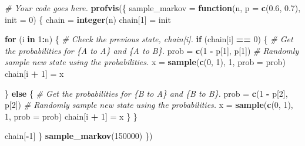 \documentclass[
]{article}
\newenvironment{Shaded}{\begin{snugshade}}{\end{snugshade}}
\newcommand{\CommentTok}[1]{\textcolor[rgb]{0.56,0.35,0.01}{\textit{#1}}}
\newcommand{\ControlFlowTok}[1]{\textcolor[rgb]{0.13,0.29,0.53}{\textbf{#1}}}
\newcommand{\DataTypeTok}[1]{\textcolor[rgb]{0.13,0.29,0.53}{#1}}
\newcommand{\DecValTok}[1]{\textcolor[rgb]{0.00,0.00,0.81}{#1}}
\newcommand{\FloatTok}[1]{\textcolor[rgb]{0.00,0.00,0.81}{#1}}
\newcommand{\KeywordTok}[1]{\textcolor[rgb]{0.13,0.29,0.53}{\textbf{#1}}}
\newcommand{\NormalTok}[1]{#1}
\newcommand{\OperatorTok}[1]{\textcolor[rgb]{0.81,0.36,0.00}{\textbf{#1}}}
\newcommand{\StringTok}[1]{\textcolor[rgb]{0.31,0.60,0.02}{#1}}
\begin{document}
\begin{Shaded}
\begin{Highlighting}[]
\CommentTok{\# Your code goes here.}
\KeywordTok{profvis}\NormalTok{(\{}
\NormalTok{  sample\_markov =}\StringTok{ }\ControlFlowTok{function}\NormalTok{(n, }\DataTypeTok{p =} \KeywordTok{c}\NormalTok{(}\FloatTok{0.6}\NormalTok{, }\FloatTok{0.7}\NormalTok{), }\DataTypeTok{init =} \DecValTok{0}\NormalTok{) \{}
\NormalTok{  chain =}\StringTok{ }\KeywordTok{integer}\NormalTok{(n)}
\NormalTok{  chain[}\DecValTok{1}\NormalTok{] =}\StringTok{ }\NormalTok{init}

  \ControlFlowTok{for}\NormalTok{ (i }\ControlFlowTok{in} \DecValTok{1}\OperatorTok{:}\NormalTok{n) \{}
    \CommentTok{\# Check the previous state, chain[i].}
    \ControlFlowTok{if}\NormalTok{ (chain[i] }\OperatorTok{==}\StringTok{ }\DecValTok{0}\NormalTok{) \{}
      \CommentTok{\# Get the probabilities for \{A to A\} and \{A to B\}.}
\NormalTok{      prob =}\StringTok{ }\KeywordTok{c}\NormalTok{(}\DecValTok{1} \OperatorTok{{-}}\StringTok{ }\NormalTok{p[}\DecValTok{1}\NormalTok{], p[}\DecValTok{1}\NormalTok{])}
      \CommentTok{\# Randomly sample new state using the probabilities.}
\NormalTok{      x =}\StringTok{ }\KeywordTok{sample}\NormalTok{(}\KeywordTok{c}\NormalTok{(}\DecValTok{0}\NormalTok{, }\DecValTok{1}\NormalTok{), }\DecValTok{1}\NormalTok{, }\DataTypeTok{prob =}\NormalTok{ prob)}
\NormalTok{      chain[i }\OperatorTok{+}\StringTok{ }\DecValTok{1}\NormalTok{] =}\StringTok{ }\NormalTok{x}

\NormalTok{    \} }\ControlFlowTok{else}\NormalTok{ \{}
      \CommentTok{\# Get the probabilities for \{B to A\} and \{B to B\}.}
\NormalTok{      prob =}\StringTok{ }\KeywordTok{c}\NormalTok{(}\DecValTok{1} \OperatorTok{{-}}\StringTok{ }\NormalTok{p[}\DecValTok{2}\NormalTok{], p[}\DecValTok{2}\NormalTok{])}
      \CommentTok{\# Randomly sample new state using the probabilities.}
\NormalTok{      x =}\StringTok{ }\KeywordTok{sample}\NormalTok{(}\KeywordTok{c}\NormalTok{(}\DecValTok{0}\NormalTok{, }\DecValTok{1}\NormalTok{), }\DecValTok{1}\NormalTok{, }\DataTypeTok{prob =}\NormalTok{ prob)}
\NormalTok{      chain[i }\OperatorTok{+}\StringTok{ }\DecValTok{1}\NormalTok{] =}\StringTok{ }\NormalTok{x}
\NormalTok{    \}}
\NormalTok{  \}}

\NormalTok{  chain[}\OperatorTok{{-}}\DecValTok{1}\NormalTok{]}
\NormalTok{\}}
  \KeywordTok{sample\_markov}\NormalTok{(}\DecValTok{150000}\NormalTok{)}
\NormalTok{\})}
\end{Highlighting}
\end{Shaded}
\end{document}
